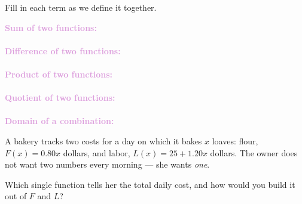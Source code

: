 \documentclass[10pt]{article}
\begin{document}

\vspace{0.12in}

\boxguard
\begin{vocabbox}
Fill in each term as we define it together.
\par\vspace{2pt}
\noindent\textbf{\textcolor{plum}{Sum of two functions:}}\\[1pt]
\\[3pt]
\noindent\textbf{\textcolor{plum}{Difference of two functions:}}\\[1pt]
\\[3pt]
\noindent\textbf{\textcolor{plum}{Product of two functions:}}\\[1pt]
\\[3pt]
\noindent\textbf{\textcolor{plum}{Quotient of two functions:}}\\[1pt]
\\[3pt]
\noindent\textbf{\textcolor{plum}{Domain of a combination:}}\\[1pt]
\end{vocabbox}

\vspace{0.1in}

\boxguard
\begin{hookbox}
A bakery tracks two costs for a day on which it bakes $x$ loaves: flour,
$F(x) = 0.80x$ dollars, and labor, $L(x) = 25 + 1.20x$ dollars. The owner does
not want two numbers every morning --- she wants \emph{one}.

Which single function tells her the total daily cost, and how would you build it
out of $F$ and $L$?
\end{hookbox}
\end{document}
